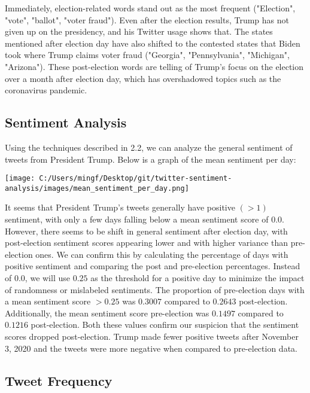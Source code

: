 \documentclass[11pt]{article} %
\begin{document}
Immediately, election-related words stand out as the most frequent ("Election", "vote", "ballot", "voter fraud").
Even after the election results, Trump has not given up on the presidency, and his Twitter usage shows that.
The states mentioned after election day have also shifted to the contested states that Biden took where Trump claims voter fraud ("Georgia", "Pennsylvania", "Michigan", "Arizona").
These post-election words are telling of Trump's focus on the election over a month after election day, which has overshadowed topics such as the coronavirus pandemic.

\subsection{Sentiment Analysis}

Using the techniques described in 2.2, we can analyze the general sentiment of tweets from President Trump.
Below is a graph of the mean sentiment per day:

\begin{center}
    \texttt{[image: C:/Users/mingf/Desktop/git/twitter-sentiment-analysis/images/mean\_sentiment\_per\_day.png]}
\end{center}

It seems that President Trump's tweets generally have positive $(> 1)$ sentiment, with only a few days falling below a mean sentiment score of $0.0$.
However, there seems to be shift in general sentiment after election day, with post-election sentiment scores appearing lower and with higher variance than pre-election ones.
We can confirm this by calculating the percentage of days with positive sentiment and comparing the post and pre-election percentages.
Instead of $0.0$, we will use $0.25$ as the threshold for a positive day to minimize the impact of randomness or mislabeled sentiments.
The proportion of pre-election days with a mean sentiment score $> 0.25$ was $0.3007$ compared to $0.2643$ post-election.
Additionally, the mean sentiment score pre-election was $0.1497$ compared to $0.1216$ post-election.
Both these values confirm our suspicion that the sentiment scores dropped post-election.
Trump made fewer positive tweets after November 3, 2020 and the tweets were more negative when compared to pre-election data.

\subsection{Tweet Frequency}
\end{document}

